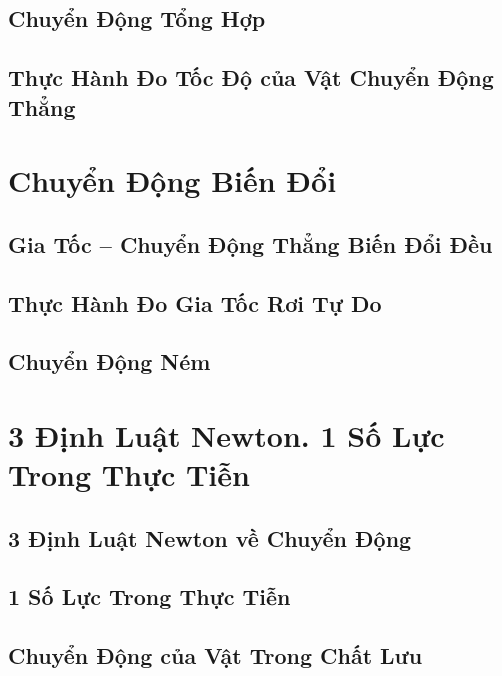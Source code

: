 \documentclass[oneside]{book}
\numberwithin{equation}{section}
\begin{document}
\section{Chuyển Động Tổng Hợp}

\section{Thực Hành Đo Tốc Độ của Vật Chuyển Động Thẳng}


\chapter{Chuyển Động Biến Đổi}

\section{Gia Tốc -- Chuyển Động Thẳng Biến Đổi Đều}

\section{Thực Hành Đo Gia Tốc Rơi Tự Do}

\section{Chuyển Động Ném}


\chapter{3 Định Luật Newton. 1 Số Lực Trong Thực Tiễn}

\section{3 Định Luật Newton về Chuyển Động}

\section{1 Số Lực Trong Thực Tiễn}

\section{Chuyển Động của Vật Trong Chất Lưu}
\end{document}
